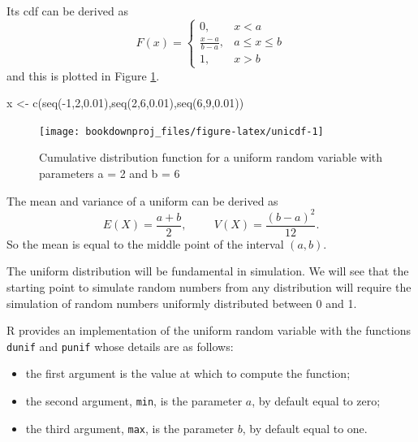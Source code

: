 \documentclass[
]{book}
\newenvironment{Shaded}{\begin{snugshade}}{\end{snugshade}}
\newcommand{\DecValTok}[1]{\textcolor[rgb]{0.00,0.00,0.81}{#1}}
\newcommand{\FloatTok}[1]{\textcolor[rgb]{0.00,0.00,0.81}{#1}}
\newcommand{\FunctionTok}[1]{\textcolor[rgb]{0.00,0.00,0.00}{#1}}
\newcommand{\NormalTok}[1]{#1}
\newcommand{\OtherTok}[1]{\textcolor[rgb]{0.56,0.35,0.01}{#1}}
\newcommand{\SpecialCharTok}[1]{\textcolor[rgb]{0.00,0.00,0.00}{#1}}
\theoremstyle{definition}
\theoremstyle{definition}
\theoremstyle{definition}
\theoremstyle{definition}
\theoremstyle{remark}
\begin{document}
Its cdf can be derived as
\[
F(x)=\left\{
\begin{array}{ll}
0, & x<a\\
\frac{x-a}{b-a}, & a\leq x \leq b\\
1, & x>b
\end{array}
\right.
\]
and this is plotted in Figure \ref{fig:unicdf}.

\begin{Shaded}
\begin{Highlighting}[]
\NormalTok{x }\OtherTok{\textless{}{-}} \FunctionTok{c}\NormalTok{(}\FunctionTok{seq}\NormalTok{(}\SpecialCharTok{{-}}\DecValTok{1}\NormalTok{,}\DecValTok{2}\NormalTok{,}\FloatTok{0.01}\NormalTok{),}\FunctionTok{seq}\NormalTok{(}\DecValTok{2}\NormalTok{,}\DecValTok{6}\NormalTok{,}\FloatTok{0.01}\NormalTok{),}\FunctionTok{seq}\NormalTok{(}\DecValTok{6}\NormalTok{,}\DecValTok{9}\NormalTok{,}\FloatTok{0.01}\NormalTok{))}
\end{Highlighting}
\end{Shaded}

\begin{figure}

{\centering \texttt{[image: bookdownproj\_files/figure-latex/unicdf-1]} 

}

\caption{Cumulative distribution function for a uniform random variable with parameters a = 2 and b = 6}\label{fig:unicdf}
\end{figure}

The mean and variance of a uniform can be derived as
\[
E(X)=\frac{a+b}{2}, \hspace{1cm} V(X)=\frac{(b-a)^2}{12}.
\]
So the mean is equal to the middle point of the interval \((a,b)\).

The uniform distribution will be fundamental in simulation. We will see that the starting point to simulate random numbers from any distribution will require the simulation of random numbers uniformly distributed between 0 and 1.

R provides an implementation of the uniform random variable with the functions \texttt{dunif} and \texttt{punif} whose details are as follows:

\begin{itemize}
\item
  the first argument is the value at which to compute the function;
\item
  the second argument, \texttt{min}, is the parameter \(a\), by default equal to zero;
\item
  the third argument, \texttt{max}, is the parameter \(b\), by default equal to one.
\end{itemize}
\end{document}
